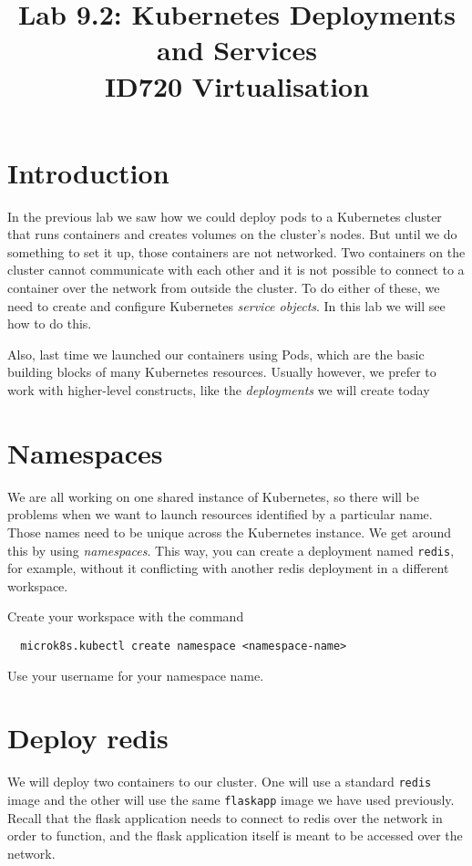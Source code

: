 \documentclass{article}
\begin{document}
\title{Lab 9.2: Kubernetes Deployments and Services \\ID720 Virtualisation}
\date{}
\maketitle

\section*{Introduction}
In the previous lab we saw how we could deploy pods to a Kubernetes cluster that runs containers and creates volumes on the cluster's nodes. But until we do something to set it up, those containers are not networked. Two containers on the cluster cannot communicate with each other and it is not possible to connect to a container over the network from outside the cluster. To do either of these, we need to create and configure Kubernetes \emph{service objects}. In this lab we will see how to do this.

Also, last time we launched our containers using Pods, which are the basic building blocks of many Kubernetes resources. Usually however, we prefer to work with higher-level constructs, like the \emph{deployments} we will create today

\section{Namespaces}
We are all working on one shared instance of Kubernetes, so there will be problems when we want to launch resources identified by a particular name. Those names need to be unique across the Kubernetes instance. We get around this by using \emph{namespaces}. This way, you can create a deployment named \texttt{redis}, for example, without it conflicting with another redis deployment in a different workspace.

Create your workspace with the command

\begin{verbatim}
  microk8s.kubectl create namespace <namespace-name>
\end{verbatim}

Use your username for your namespace name.  



\section{Deploy redis}
We will deploy two containers to our cluster. One will use a standard \texttt{redis} image and the other will use the same \texttt{flaskapp} image we have used previously. Recall that the flask application needs to connect to redis over the network in order to function, and the flask application itself is meant to be accessed over the network.
\end{document}
